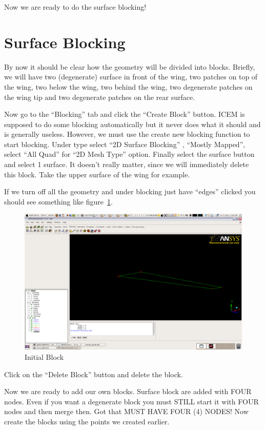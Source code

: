 \documentclass{report}
\begin{document}
Now we are ready to do the surface blocking!

\section{Surface Blocking}

By now it should be clear how the geometry will be divided into blocks. Briefly, we will have two (degenerate) surface in front of the wing, two patches on top of the wing, two below the wing, two behind the wing, two degenerate patches on the wing tip and two degenerate patches on the rear surface.

Now go to the ``Blocking'' tab and click the ``Create Block'' button. ICEM is supposed to do some blocking automatically but it never does what it should and is generally useless. However, we must use the create new blocking function to start blocking. Under type select ``2D Surface Blocking'' , ``Mostly Mapped'', select ``All Quad'' for ``2D Mesh Type'' option. Finally select the surface button and select 1 surface. It doesn't really matter, since we will immediately delete this block. Take the upper surface of the wing for example. 

If we turn off all the geometry and under blocking just have ``edges'' clicked you should see something like figure~\ref{fig:init_block}.
\begin{figure}[htb]
  \centering
  \includegraphics[width=\textwidth,angle=0]{figures/fig8.png}
  \caption{Initial Block}
  \label{fig:init_block}
\end{figure}

Click on the ``Delete Block'' button and delete the block.

Now we are ready to add our own blocks. Surface block are added with FOUR nodes. Even if you want a degenerate block you must STILL start it with FOUR nodes and then merge then. Got that MUST HAVE FOUR (4) NODES! Now create the blocks using the points we created earlier. 
\end{document}
